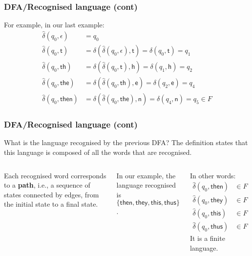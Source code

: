 % 
\begin{frame}
\frametitle{DFA/Recognised language (cont)}

For example, in our last example:
\[
\begin{aligned}
   \hat{\delta}(q_0, \epsilon)
&= q_0\\
   \hat{\delta}(q_0, \textsf{t})
&= \delta (\hat{\delta}(q_0, \epsilon), \textsf{t})
= \delta (q_0, \textsf{t}) 
= q_1\\
   \hat{\delta}(q_0, \textsf{th})
&= \delta (\hat{\delta}(q_0, \textsf{t}), \textsf{h})
= \delta (q_1, \textsf{h})
= q_2\\
   \hat{\delta}(q_0, \textsf{the})
&= \delta (\hat{\delta}(q_0, \textsf{th}), \textsf{e})
= \delta (q_2, \textsf{e})
= q_4\\
   \hat{\delta}(q_0, \textsf{then}) 
&= \delta (\hat{\delta}(q_0, \textsf{the}), \textsf{n})
= \delta (q_4, \textsf{n})
= q_5 \in F
\end{aligned}
\]

\end{frame}

% 
\begin{frame}
\frametitle{DFA/Recognised language (cont)}

What is the language recognised by the previous DFA? The definition
states that this language is composed of all the words that are
recognised.

\bigskip

\begin{columns}

   Each recognised word corresponds to a
  \textbf{path}, i.e., a sequence of states connected by edges, from
  the initial state to a final state.

  \bigskip

  In our example, the language recognised is \(\{\textsf{then},
  \textsf{they}, \textsf{this}, \textsf{thus}\}\). 

   In other words:
  \begin{align*}
    \hat{\delta}(q_0, \textsf{then}) &\in F\\
    \hat{\delta}(q_0, \textsf{they}) &\in F\\
    \hat{\delta}(q_0, \textsf{this}) &\in F\\
    \hat{\delta}(q_0, \textsf{thus}) &\in F
  \end{align*}
  It is a finite language.

\end{columns}

\end{frame}


